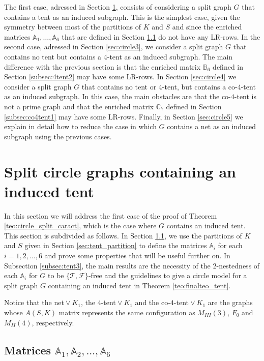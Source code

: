 \documentclass[12pt]{book}
\theoremstyle{plain}
\newcounter{cases}
\theoremstyle{remark}
\begin{document}
The first case, adressed in Section \ref{sec:circle2}, consists of considering a split graph $G$ that contains a tent as an induced subgraph. This is the simplest case, given the symmetry between most of the partitions of $K$ and $S$ and since the enriched matrices $\mathbb A_1, \ldots, \mathbb A_6$ that are defined in Section \ref{subsec:tent2} do not have any LR-rows.
In the second case, adressed in Section \ref{sec:circle3}, we consider a split graph $G$ that contains no  tent but contains a $4$-tent as an induced subgraph. The main difference with the previous section is that the enriched matrix $\mathbb B_6$ defined in Section \ref{subsec:4tent2} may have some LR-rows.
In Section \ref{sec:circle4} we consider a split graph $G$ that contains no tent or $4$-tent, but contains a co-$4$-tent as an induced subgraph. In this case, the main obstacles are that the co-$4$-tent is not a prime graph and that the enriched matrix $\mathbb C_7$ defined in Section \ref{subsec:co4tent1} may have some LR-rows.
Finally, in Section \ref{sec:circle5} we explain in detail how to reduce the case in which $G$ contains a net as an induced subgraph using the previous cases.


\section{Split circle graphs containing an induced tent} \label{sec:circle2}

In this section we will address the first case of the proof of Theorem \ref{teo:circle_split_caract}, which is the case where $G$ contains an induced tent.
This section is subdivided as follows. In Section \ref{subsec:tent2}, we use the partitions of $K$ and $S$ given in Section \ref{sec:tent_partition} to define the matrices $\mathbb{A}_i$ for each $i=1, 2, \ldots, 6$ and prove some properties that will be useful further on. 
In Subsection \ref{subsec:tent3}, the main results are the necessity of the $2$-nestedness of each $\mathbb A_i$ for $G$ to be $\{\mathcal{T}, \mathcal{F}\}$-free and the guidelines to give a circle model for a split graph $G$ containing an induced tent in Theorem \ref{teo:finalteo_tent}.

Notice that the net${}\vee{}K_1$, the $4$-tent${}\vee{}K_1$ and the co-$4$-tent${}\vee{} K_1$ are the graphs whose $A(S,K)$ matrix represents the same configuration as $M_{III}(3)$, $F_0$ and $M_{II}(4)$, respectively.



\subsection{Matrices $\mathbb A_1,\mathbb A_2,\ldots,\mathbb A_6$} \label{subsec:tent2}
\end{document}
